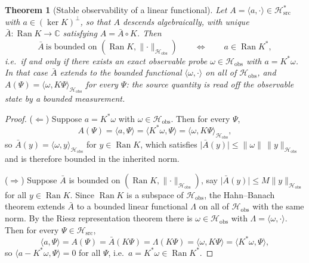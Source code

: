 \documentclass[11pt,reqno]{amsart}
\numberwithin{equation}{section}
\theoremstyle{plain}
\newtheorem{theorem}{Theorem}[section]
\theoremstyle{definition}
\theoremstyle{remark}
\newcommand{\Hsrc}{\mathcal{H}_{\mathrm{src}}}
\newcommand{\Hobs}{\mathcal{H}_{\mathrm{obs}}}
\newcommand{\Ran}{\operatorname{Ran}}
\newcommand{\inner}[2]{\langle #1 , #2 \rangle}
\begin{document}
\begin{theorem}[Stable observability of a linear functional]
\label{thm:stableobs}
Let $A=\inner{a}{\cdot}\in\Hsrc^{*}$ with $a\in(\ker K)^{\perp}$, so that $A$ descends
algebraically, with unique $\bar A:\Ran K\to\mathbb{C}$ satisfying $A=\bar A\circ K$. Then
\begin{equation}
\label{eq:stableobs}
\bar A\ \text{is bounded on }(\Ran K,\lVert\cdot\rVert_{\Hobs})
\qquad\Longleftrightarrow\qquad
a\in\Ran K^{*} ,
\end{equation}
i.e.\ if and only if there exists an \emph{exact} observable probe $\omega\in\Hobs$ with
$a=K^{*}\omega$. In that case $\bar A$ extends to the bounded functional
$\inner{\omega}{\cdot}$ on all of $\Hobs$, and
$A(\Psi)=\inner{\omega}{K\Psi}_{\Hobs}$ for every $\Psi$: the source quantity is read off the
observable state by a bounded measurement.
\end{theorem}

\begin{proof}
($\Leftarrow$) Suppose $a=K^{*}\omega$ with $\omega\in\Hobs$. Then for every $\Psi$,
\[
A(\Psi)=\inner{a}{\Psi}=\inner{K^{*}\omega}{\Psi}=\inner{\omega}{K\Psi}_{\Hobs},
\]
so $\bar A(y)=\inner{\omega}{y}_{\Hobs}$ for $y\in\Ran K$, which satisfies
$\lvert\bar A(y)\rvert\le\lVert\omega\rVert\,\lVert y\rVert_{\Hobs}$ and is therefore bounded
in the inherited norm.

($\Rightarrow$) Suppose $\bar A$ is bounded on $(\Ran K,\lVert\cdot\rVert_{\Hobs})$, say
$\lvert\bar A(y)\rvert\le M\lVert y\rVert_{\Hobs}$ for all $y\in\Ran K$. Since $\Ran K$ is a
subspace of $\Hobs$, the Hahn--Banach theorem \cite[Cor.~1.2]{Brezis} extends $\bar A$ to a
bounded linear functional $\Lambda$ on all of $\Hobs$ with the same norm. By the Riesz
representation theorem there is $\omega\in\Hobs$ with $\Lambda=\inner{\omega}{\cdot}$. Then for
every $\Psi\in\Hsrc$,
\[
\inner{a}{\Psi}=A(\Psi)=\bar A(K\Psi)=\Lambda(K\Psi)=\inner{\omega}{K\Psi}
=\inner{K^{*}\omega}{\Psi} ,
\]
so $\inner{a-K^{*}\omega}{\Psi}=0$ for all $\Psi$, i.e.\ $a=K^{*}\omega\in\Ran K^{*}$.
\end{proof}
\end{document}
